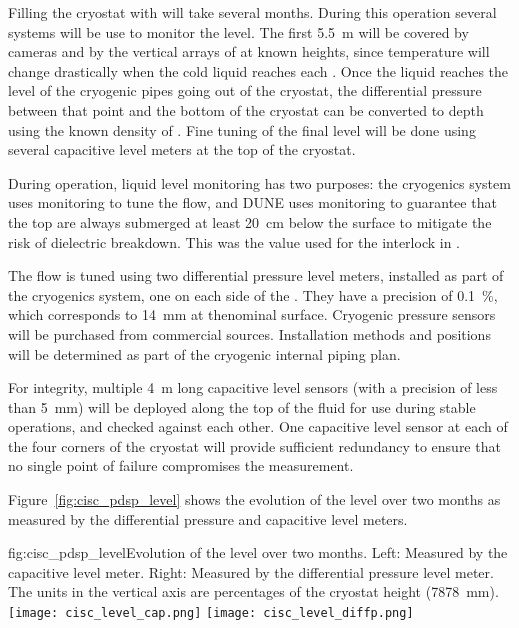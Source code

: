 Filling the cryostat with  will take several months. During this operation several systems will be use to monitor the  level. 
The first \SI{5.5}{m} will be covered by cameras and by the vertical arrays of  at known heights, since temperature will change drastically 
when the cold liquid reaches each . Once the liquid reaches the level of the cryogenic pipes going out of the cryostat, 
the differential pressure between that point and the bottom of the cryostat
can be converted to depth using
the known density of .   Fine tuning of the final  level will be done using several capacitive level meters at the top of the cryostat. 

During operation, liquid level monitoring has two purposes:
the  cryogenics system uses monitoring to tune the  flow, and 
DUNE uses monitoring to guarantee that the top  are always
submerged 
at least \SI{20}{cm} below the  surface to mitigate the risk of dielectric breakdown. This was the value used for the  interlock in . 

The  flow is tuned using two differential pressure level meters, installed as part of the cryogenics system, one on each side of the .  They have a precision of \SI{0.1}{\%}, which corresponds to \SI{14}{mm} at thenominal  surface. Cryogenic pressure sensors will be purchased from commercial sources. Installation methods and positions will be determined as part of the
cryogenic internal piping plan.  

For  integrity, multiple \SI{4}{m} long capacitive level sensors (with a precision of less than \SI{5}{mm}) will be deployed along the top of the fluid %
for use during stable operations, and checked against each other.
One capacitive level sensor at each of the four corners of the cryostat will provide sufficient redundancy to ensure that no single point of failure compromises the %
measurement.


Figure~\ref{fig:cisc_pdsp_level} shows the evolution of the   level over two months as measured by the differential pressure and capacitive level meters. 

\begin{dunefigure}{fig:cisc_pdsp_level}{Evolution of the   level over two months. Left: Measured by the capacitive level meter. Right: Measured by the differential pressure level meter. The units in the vertical axis are percentages of the cryostat height (\SI{7878}{mm}).}
  \texttt{[image: cisc\_level\_cap.png]}%
  \hspace*{1cm}
  \texttt{[image: cisc\_level\_diffp.png]}%
\end{dunefigure}

